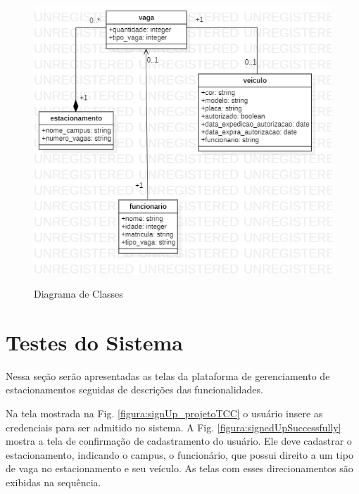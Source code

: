 \begin{figure}[h]
	\caption{Diagrama de Classes}
	\centering %
	\includegraphics[scale=0.7]{Figs/estacionamentoIfrn_1.png} %
	\label{figura:estacionamentoIfrn}
\end{figure}


\section{Testes do Sistema}
\label{testesSoft}



Nessa seção serão apresentadas as telas da plataforma de gerenciamento de estacionamentos seguidas de descrições das funcionalidades.

Na tela mostrada na Fig. \ref{figura:signUp_projetoTCC} o usuário insere as credenciais para ser admitido no
sistema. A Fig. \ref{figura:signedUpSuccessfully} mostra a tela de confirmação de cadastramento do usuário. Ele deve cadastrar o estacionamento, indicando o campus, o funcionário, que possui direito a um tipo de vaga no estacionamento e seu veículo. As telas com esses direcionamentos são exibidas na sequência.








